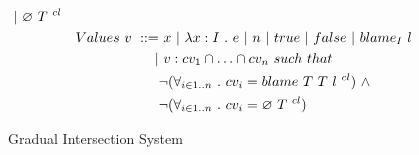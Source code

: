 \documentclass[a4paper]{article}
\begin{document}
\begin{figure}[H]
\begin{align*}
\begin{aligned}[t]
                                       |&\ \emptycast{T}{cl} \end{aligned}\\
&Values\ \begin{aligned}[t] v\ ::=&\ x\ |\ \lambda x : I\ .\ e\ |\ n\ |\ \true\ |\ \false\ |\ \blame{I}{l}\\
                                 |&\ v : cv_1 \cap \ldots \cap cv_n\ such\ that\\
                                 &\neg(\forall_{i\in 1..n}\ .\ cv_i = \blamecast{T}{T}{l}{cl})\ \land\\
                                 &\neg(\forall_{i\in 1..n}\ .\ cv_i = \emptycast{T}{cl}) \end{aligned}
\end{align*}
\hrulefill
\caption{Gradual Intersection System}
\label{intersection_syntax}
\end{figure}
\end{document}

